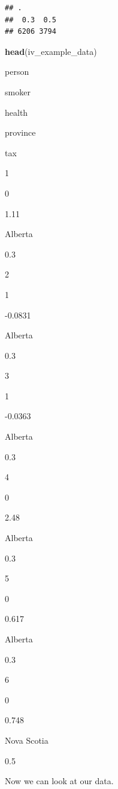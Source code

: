 \documentclass[
]{book}
\newenvironment{Shaded}{\begin{snugshade}}{\end{snugshade}}
\newcommand{\KeywordTok}[1]{\textcolor[rgb]{0.13,0.29,0.53}{\textbf{#1}}}
\newcommand{\NormalTok}[1]{#1}
\begin{document}
\begin{verbatim}
## .
##  0.3  0.5 
## 6206 3794
\end{verbatim}

\begin{Shaded}
\begin{Highlighting}[]
\KeywordTok{head}\NormalTok{(iv_example_data)}
\end{Highlighting}
\end{Shaded}

\label{tab:unnamed-chunk-387}

person

smoker

health

province

tax

1

0

1.11~~

Alberta

0.3

2

1

-0.0831

Alberta

0.3

3

1

-0.0363

Alberta

0.3

4

0

2.48~~

Alberta

0.3

5

0

0.617~

Alberta

0.3

6

0

0.748~

Nova Scotia

0.5

Now we can look at our data.
\end{document}
